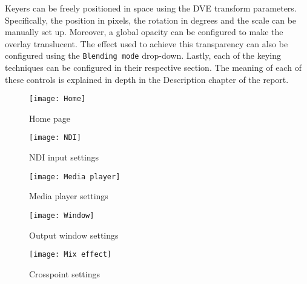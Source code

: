 \documentclass[../main.tex]{subfiles}
\begin{document}
Keyers can be freely positioned in space using the DVE transform parameters. Specifically, the position in pixels, the rotation in degrees and the scale can be manually set up. Moreover, a global opacity can be configured to make the overlay translucent. The effect used to achieve this transparency can also be configured using the \texttt{Blending mode} drop-down. Lastly, each of the keying techniques can be configured in their respective section. The meaning of each of these controls is explained in depth in the Description chapter of the report.\newline



\begin{landscape}
\begin{figure}[htbp]
        \centering
        \texttt{[image: Home]}
        \caption{Home page}
        \label{fig:home}
\end{figure}
\end{landscape}

\begin{landscape}
\begin{figure}[htbp]
        \centering
        \texttt{[image: NDI]}
        \caption{NDI input settings}
        \label{fig:ndi_input_settings}
\end{figure}
\end{landscape}


\begin{landscape}
\begin{figure}[htbp]
        \centering
        \texttt{[image: Media player]}
        \caption{Media player settings}
        \label{fig:media_player_settings}
\end{figure}
\end{landscape}

\begin{landscape}
\begin{figure}[htbp]
        \centering
        \texttt{[image: Window]}
        \caption{Output window settings}
        \label{fig:output_window_settings}
\end{figure}
\end{landscape}



\begin{landscape}
\begin{figure}[htbp]
        \centering
        \texttt{[image: Mix effect]}
        \caption{Crosspoint settings}
        \label{fig:mix_effect}
\end{figure}
\end{landscape}
\end{document}
